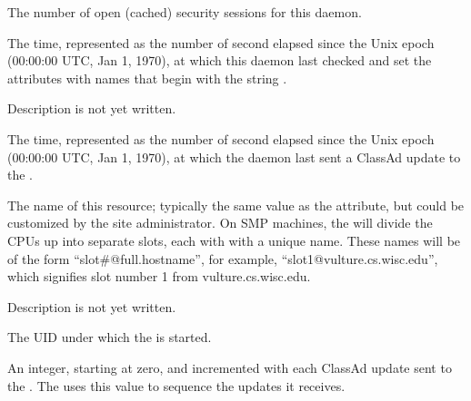 \begin{description}
\item[\AdAttr{MonitorSelfSecuritySessions}:] The number of open (cached)
  security sessions for this daemon.

\item[\AdAttr{MonitorSelfTime}:] The  time, represented as the number of
  second elapsed since the Unix epoch (00:00:00 UTC, Jan 1, 1970),
  at which this daemon last checked and set the attributes with names that
  begin with the string .
  

\item[\AdAttr{MyAddress}:] Description is not yet written.

\item[\AdAttr{MyCurrentTime}:] The time, represented as the number of
  second elapsed since the Unix epoch (00:00:00 UTC, Jan 1, 1970),
  at which the  daemon last sent a ClassAd update to the
  .

\item[\AdAttr{Name}:] The name of this resource; typically the same value as
  the  attribute, but could be customized by the site
  administrator.
  On SMP machines, the  will divide the CPUs up into separate
  slots, each with with a unique name.
  These names will be of the form ``slot\#@full.hostname'', for example,
  ``slot1@vulture.cs.wisc.edu'', which signifies slot number 1 from
  vulture.cs.wisc.edu.

\item[\AdAttr{PublicNetworkIpAddr}:] Description is not yet written.

\item[\AdAttr{RealUid}:] The UID under which the  is started.

\item[\AdAttr{UpdateSequenceNumber}:] An integer, starting at zero,
  and incremented with each ClassAd update sent to the .
  The  uses this value to sequence the updates it
  receives.

\end{description}

